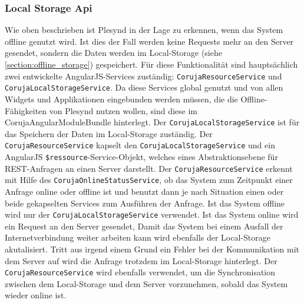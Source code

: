 \subsubsection{Local Storage Api}\label{section:local_storage_api}
Wie oben beschrieben ist Plesynd in der Lage zu erkennen, wenn das System offline genutzt wird. Ist dies der Fall werden keine Requests mehr an den Server gesendet, sondern die Daten werden im Local-Storage (siehe \ref{section:offline_storage}) gespeichert. Für diese Funktionalität sind hauptsächlich zwei entwickelte AngularJS-Services zuständig: \texttt{CorujaResourceService} und \texttt{CorujaLocalStorageService}. Da diese Services global genutzt und von allen Widgets und Applikationen eingebunden werden müssen, die die Offline-Fähigkeiten von Plesynd nutzen wollen, sind diese im CorujaAngularModuleBundle hinterlegt. Der \texttt{CorujaLocalStorageService} ist für das
Speichern der Daten im Local-Storage zuständig. Der \texttt{CorujaResourceService} kapselt den \texttt{CorujaLocalStorageService} und ein AngularJS \texttt{\$ressource}-Service-Objekt, welches eines Abstraktionsebene für REST-Anfragen an einen Server darstellt. Der \texttt{CorujaResourceService} erkennt mit Hilfe des \texttt{CorujaOnlineStatusService}, ob das System zum Zeitpunkt einer Anfrage online oder offline ist und benutzt dann je nach Situation einen oder beide gekapselten Services zum Ausführen der Anfrage. Ist das System offline wird nur der \texttt{CorujaLocalStorageService} verwendet. Ist das System online wird ein Request an den Server gesendet, Damit das System bei einem Ausfall der Internetverbindung weiter arbeiten kann wird ebenfalls der Local-Storage akutalisiert. Tritt aus irgend einem Grund ein Fehler bei der Kommunikation mit dem Server auf wird die Anfrage trotzdem im Local-Storage hinterlegt. Der \texttt{CorujaResourceService} wird ebenfalls verwendet, um die Synchronisation zwischen dem Local-Storage und dem Server vorzunehmen, sobald das System wieder online ist. 

